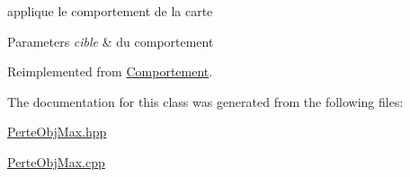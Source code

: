 applique le comportement de la carte 


\begin{DoxyParams}{Parameters}
{\em cible} & du comportement \\
\hline
\end{DoxyParams}


Reimplemented from \hyperlink{class_comportement_ae55149d29c710b0a5a0388cae308024f}{Comportement}.



The documentation for this class was generated from the following files\-:\begin{DoxyCompactItemize}
\item 
\hyperlink{_perte_obj_max_8hpp}{Perte\-Obj\-Max.\-hpp}\item 
\hyperlink{_perte_obj_max_8cpp}{Perte\-Obj\-Max.\-cpp}\end{DoxyCompactItemize}
